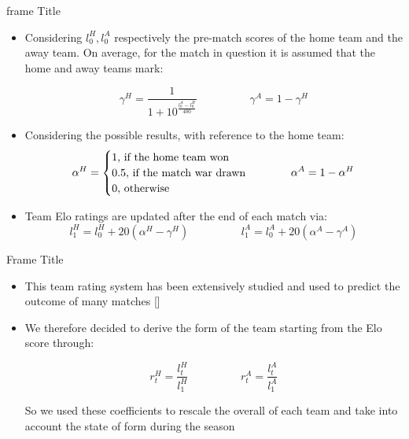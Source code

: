 \documentclass[aspectratio=169,xcolor=dvipsnames]{beamer}
\begin{document}
\begin{frame}{frame Title}
\begin{itemize}
 
    \item Considering $ l_0 ^ {H}, l_0 ^ {A} $ respectively the pre-match scores of the home team and the away team. On average, for the match in question it is assumed that the home and away teams mark:
    
    \begin{equation*}
        \gamma^{H} = \frac{1}{1+10^\frac{{l_0^{A} - l_0^{H}}}{400}}
        \hspace{2cm}
        \gamma^{A} = 1-\gamma^{H}
    \end{equation*}
    
    \item Considering the possible results, with reference to the home team:
    \begin{equation*}
        \alpha^H = 
        \begin{cases}
            1,$    if the home team won$ \\
            0.5,$    if the match war drawn$\\
            0, $    otherwise$
        \end{cases}
        \hspace{1cm}
        \alpha^A = 1-\alpha^H
    \end{equation*} 
    
    \item Team Elo ratings are updated after the end of each match via:
    \begin{equation*}
        l_1^H = l_0^H + 20(\alpha^H - \gamma^H) 
        \hspace{2cm}
        l_1^A = l_0^A + 20(\alpha^A - \gamma^A) 
    \end{equation*}
\end{itemize}
\end{frame}


\begin{frame}{Frame Title}
    \begin{itemize}
    
        \item This team rating system has been extensively studied and used to predict the outcome of many matches []

        \item We therefore decided to derive the form of the team starting from the Elo score through:
        
        \begin{equation*}
            r^{H}_t = \frac{l^{H}_t}{l^H_1} \hspace{2cm} r^{A}_t = \frac{l^{A}_t}{l^A_1}
        \end{equation*}
    
        So we used these coefficients to rescale the overall of each team and take into account the state of form during the season
    \end{itemize}
\end{frame}
\end{document}
